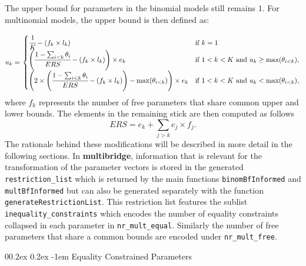 \documentclass[
  english,
  man,floatsintext]{apa6}
\makeatletter
\let\oldparagraph\paragraph
\renewcommand{\paragraph}[1]{\oldparagraph{#1}\mbox{}}
\renewcommand{\paragraph}{\@startsection{paragraph}{4}{\parindent}%
  {0\baselineskip \@plus 0.2ex \@minus 0.2ex}%
  {-1em}%
  {\normalfont\normalsize\bfseries\itshape\typesectitle}}
\makeatother
\begin{document}
\begin{appendix}
The upper bound for parameters in the binomial models still remains
\(1\). For multinomial models, the upper bound is then defined as:

\begin{align}
u_k = \left.
\begin{cases}
\cfrac{1}{K} - (f_k \times l_k) & \text{if } k = 1 \\
\left( \cfrac{1 - \sum_{i < k} \theta_i}{ERS} - (f_k \times l_k) \right) \times e_k & \text{if } 1 < k < K \text{ and } u_k \geq \text{max}(\theta_{i < k}), \\
\left( 2 \times \left( \cfrac{1 - \sum_{i < k} \theta_i}{ERS} - (f_k \times l_k) \right) - \text{max}(\theta_{i < k}) \right)  \times e_k & \text{if } 1 < k < K \text{ and } u_k < \text{max}(\theta_{i < k}),
\end{cases}
\right.
\end{align} where \(f_k\) represents the number of free parameters that
share common upper and lower bounds. The elements in the remaining stick
are then computed as follows
\[ERS = e_k + \sum_{j > k} e_j \times f_j.\] The rationale behind these
modifications will be described in more detail in the following
sections. In \textbf{multibridge}, information that is relevant for the
transformation of the parameter vectors is stored in the generated
\texttt{restriction\_list} which is returned by the main functions
\texttt{binomBfInformed} and \texttt{multBfInformed} but can also be
generated separately with the function \texttt{generateRestrictionList}.
This restriction list features the sublist
\texttt{inequality\_constraints} which encodes the number of equality
constraints collapsed in each parameter in \texttt{nr\_mult\_equal}.
Similarly the number of free parameters that share a common bounds are
encoded under \texttt{nr\_mult\_free}.

\hypertarget{equality-constrained-parameters}{%
\paragraph{Equality Constrained
Parameters}\label{equality-constrained-parameters}}


\end{appendix}
\end{document}
